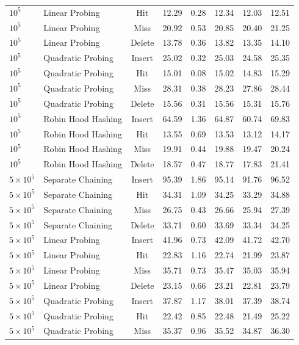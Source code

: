 \documentclass[conference]{IEEEtran}
\begin{document}
\begin{table}[t]
\begin{tabular}{llcccccc}
$10^5$ & Linear Probing & Hit & 12.29 & 0.28 & 12.34 & 12.03 & 12.51 \\
$10^5$ & Linear Probing & Miss & 20.92 & 0.53 & 20.85 & 20.40 & 21.25 \\
$10^5$ & Linear Probing & Delete & 13.78 & 0.36 & 13.82 & 13.35 & 14.10 \\
$10^5$ & Quadratic Probing & Insert & 25.02 & 0.32 & 25.03 & 24.58 & 25.35 \\
$10^5$ & Quadratic Probing & Hit & 15.01 & 0.08 & 15.02 & 14.83 & 15.29 \\
$10^5$ & Quadratic Probing & Miss & 28.31 & 0.38 & 28.23 & 27.86 & 28.44 \\
$10^5$ & Quadratic Probing & Delete & 15.56 & 0.31 & 15.56 & 15.31 & 15.76 \\
$10^5$ & Robin Hood Hashing & Insert & 64.59 & 1.36 & 64.87 & 60.74 & 69.83 \\
$10^5$ & Robin Hood Hashing & Hit & 13.55 & 0.69 & 13.53 & 13.12 & 14.17 \\
$10^5$ & Robin Hood Hashing & Miss & 19.91 & 0.44 & 19.88 & 19.47 & 20.24 \\
$10^5$ & Robin Hood Hashing & Delete & 18.57 & 0.47 & 18.77 & 17.83 & 21.41 \\
\midrule
$5 \times 10^5$ & Separate Chaining & Insert & 95.39 & 1.86 & 95.14 & 91.76 & 96.52 \\
$5 \times 10^5$ & Separate Chaining & Hit & 34.31 & 1.09 & 34.25 & 33.29 & 34.88 \\
$5 \times 10^5$ & Separate Chaining & Miss & 26.75 & 0.43 & 26.66 & 25.94 & 27.39 \\
$5 \times 10^5$ & Separate Chaining & Delete & 33.71 & 0.60 & 33.69 & 33.34 & 34.25 \\
$5 \times 10^5$ & Linear Probing & Insert & 41.96 & 0.73 & 42.09 & 41.72 & 42.70 \\
$5 \times 10^5$ & Linear Probing & Hit & 22.83 & 1.16 & 22.74 & 21.99 & 23.87 \\
$5 \times 10^5$ & Linear Probing & Miss & 35.71 & 0.73 & 35.47 & 35.03 & 35.94 \\
$5 \times 10^5$ & Linear Probing & Delete & 23.15 & 0.66 & 23.21 & 22.81 & 23.79 \\
$5 \times 10^5$ & Quadratic Probing & Insert & 37.87 & 1.17 & 38.01 & 37.39 & 38.74 \\
$5 \times 10^5$ & Quadratic Probing & Hit & 22.42 & 0.85 & 22.48 & 21.49 & 25.22 \\
$5 \times 10^5$ & Quadratic Probing & Miss & 35.37 & 0.96 & 35.52 & 34.87 & 36.30 \\

\end{tabular}
\end{table}
\end{document}
